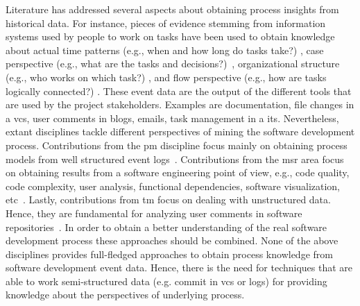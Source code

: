 Literature has addressed several aspects about obtaining process insights from historical data. For instance, pieces of evidence stemming from information systems used by people to work on tasks have been used to obtain knowledge about actual time patterns 
(e.g., when and how long do tasks take?) \cite{Lanz2014}, case perspective (e.g., what are the tasks and decisions?)~\cite{VanderAalst2005}, organizational structure (e.g., who works on which task?) \cite{Schonig2016b}, and flow perspective (e.g., how are tasks logically connected?) \cite{VanderAalst2007b}. These event data are the output of the different tools that are used by the project stakeholders. Examples are documentation, file changes in a \gls{vcs}, user comments in blogs, emails, task management in a \gls{its}.
Nevertheless,
 extant disciplines tackle different perspectives of mining the software development process. Contributions from the \gls{pm} discipline focus mainly on obtaining process models from well structured event logs~\cite{VanderAalst2016b}. Contributions from the \gls{msr} area focus on obtaining results from a software engineering point of view, e.g., code quality, code complexity, user analysis, functional dependencies, software visualization, etc~\cite{Pinzger2016}. 
 Lastly, contributions from \gls{tm} focus on dealing with unstructured data. Hence, they are fundamental for analyzing user comments in software repositories~\cite{Aggarwal2015}. In order to obtain a better understanding of the real software development process these approaches should be combined. None of the above disciplines provides full-fledged approaches to obtain process knowledge from software development event data. Hence, there is the need for techniques that are able to work semi-structured data (e.g. commit in \gls{vcs} or logs) for providing knowledge about the perspectives of underlying process.


